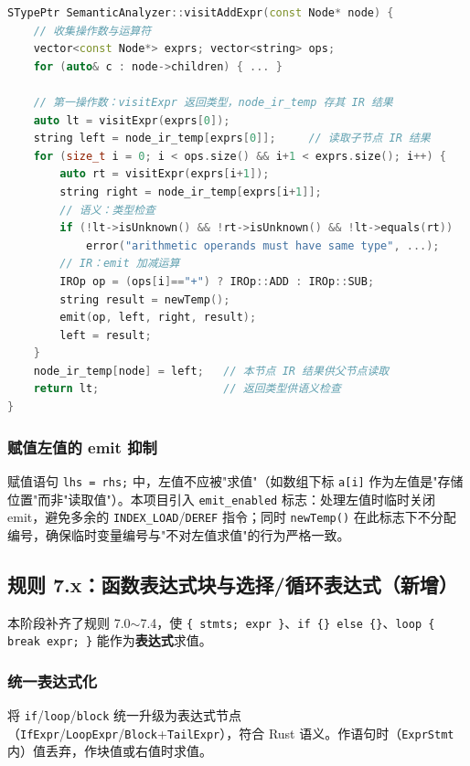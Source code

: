 \documentclass[12pt,a4paper]{ctexart}
\begin{document}
\begin{lstlisting}[language=C++, caption={嫁接后的表达式 visitor 示例（加法表达式）}]
STypePtr SemanticAnalyzer::visitAddExpr(const Node* node) {
    // 收集操作数与运算符
    vector<const Node*> exprs; vector<string> ops;
    for (auto& c : node->children) { ... }

    // 第一操作数：visitExpr 返回类型，node_ir_temp 存其 IR 结果
    auto lt = visitExpr(exprs[0]);
    string left = node_ir_temp[exprs[0]];     // 读取子节点 IR 结果
    for (size_t i = 0; i < ops.size() && i+1 < exprs.size(); i++) {
        auto rt = visitExpr(exprs[i+1]);
        string right = node_ir_temp[exprs[i+1]];
        // 语义：类型检查
        if (!lt->isUnknown() && !rt->isUnknown() && !lt->equals(rt))
            error("arithmetic operands must have same type", ...);
        // IR：emit 加减运算
        IROp op = (ops[i]=="+") ? IROp::ADD : IROp::SUB;
        string result = newTemp();
        emit(op, left, right, result);
        left = result;
    }
    node_ir_temp[node] = left;   // 本节点 IR 结果供父节点读取
    return lt;                   // 返回类型供语义检查
}
\end{lstlisting}

\subsubsection{赋值左值的 emit 抑制}

赋值语句 \texttt{lhs = rhs;} 中，左值不应被"求值"（如数组下标 \texttt{a[i]} 作为左值是"存储位置"而非"读取值"）。本项目引入 \texttt{emit\_enabled} 标志：处理左值时临时关闭 emit，避免多余的 \texttt{INDEX\_LOAD}/\texttt{DEREF} 指令；同时 \texttt{newTemp()} 在此标志下不分配编号，确保临时变量编号与"不对左值求值"的行为严格一致。

\subsection{规则 7.x：函数表达式块与选择/循环表达式（新增）}

本阶段补齐了规则 7.0\(\sim\)7.4，使 \texttt{\{ stmts; expr \}}、\texttt{if \{\} else \{\}}、\texttt{loop \{ break expr; \}} 能作为\textbf{表达式}求值。

\subsubsection{统一表达式化}

将 \texttt{if}/\texttt{loop}/\texttt{block} 统一升级为表达式节点（\texttt{IfExpr}/\texttt{LoopExpr}/\texttt{Block}+\texttt{TailExpr}），符合 Rust 语义。作语句时（\texttt{ExprStmt} 内）值丢弃，作块值或右值时求值。
\end{document}
